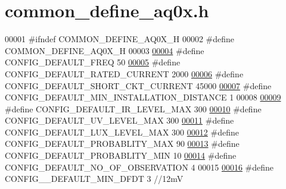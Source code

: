 \hypertarget{a00031_source}{\section{common\+\_\+define\+\_\+aq0x.\+h}
\label{a00031_source}
}

\begin{DoxyCode}
00001 \textcolor{preprocessor}{#ifndef COMMON\_DEFINE\_AQ0X\_H}
00002 \textcolor{preprocessor}{#define COMMON\_DEFINE\_AQ0X\_H}
00003 
\hypertarget{a00031_source_l00004}{}\hyperlink{a00031_a985a153b3edd3d7d638137ae0b9e5e67}{00004} \textcolor{preprocessor}{#define CONFIG\_DEFAULT\_FREQ                                     50}
\hypertarget{a00031_source_l00005}{}\hyperlink{a00031_ae329eb408f386777cbb443c27ca7c1c5}{00005} \textcolor{preprocessor}{#define CONFIG\_DEFAULT\_RATED\_CURRENT                            2000}
\hypertarget{a00031_source_l00006}{}\hyperlink{a00031_a9b142f2e7d26511af74c411c0e524384}{00006} \textcolor{preprocessor}{#define CONFIG\_DEFAULT\_SHORT\_CKT\_CURRENT                        45000}
\hypertarget{a00031_source_l00007}{}\hyperlink{a00031_aad4ef21bb535ed8bbba5a4f2d0451711}{00007} \textcolor{preprocessor}{#define CONFIG\_DEFAULT\_MIN\_INSTALLATION\_DISTANCE                1}
00008 
\hypertarget{a00031_source_l00009}{}\hyperlink{a00031_adf882de105367de21f0cbfe4490a046f}{00009} \textcolor{preprocessor}{#define CONFIG\_DEFAULT\_IR\_LEVEL\_MAX                             300}
\hypertarget{a00031_source_l00010}{}\hyperlink{a00031_a29f761c18bae89d087200e4f1891c651}{00010} \textcolor{preprocessor}{#define CONFIG\_DEFAULT\_UV\_LEVEL\_MAX                             300}
\hypertarget{a00031_source_l00011}{}\hyperlink{a00031_a04ab25767fbb61ec61784da889ec8c09}{00011} \textcolor{preprocessor}{#define CONFIG\_DEFAULT\_LUX\_LEVEL\_MAX                            300}
\hypertarget{a00031_source_l00012}{}\hyperlink{a00031_a96cf926b530a1d5968881620d2f10445}{00012} \textcolor{preprocessor}{#define CONFIG\_DEFAULT\_PROBABLITY\_MAX                           90}
\hypertarget{a00031_source_l00013}{}\hyperlink{a00031_a599be42d4b357badb7c9b16a124a186a}{00013} \textcolor{preprocessor}{#define CONFIG\_DEFAULT\_PROBABLITY\_MIN                           10}
\hypertarget{a00031_source_l00014}{}\hyperlink{a00031_af69b35a9f07bfcfe500538565d898c65}{00014} \textcolor{preprocessor}{#define CONFIG\_DEFAULT\_NO\_OF\_OBSERVATION                        4}
00015 
\hypertarget{a00031_source_l00016}{}\hyperlink{a00031_a0eae7c540b766617bb00f79cd63415a2}{00016} \textcolor{preprocessor}{#define CONFIG\_\_DEFAULT\_MIN\_DFDT                                3     //12mV}

\end{DoxyCode}
